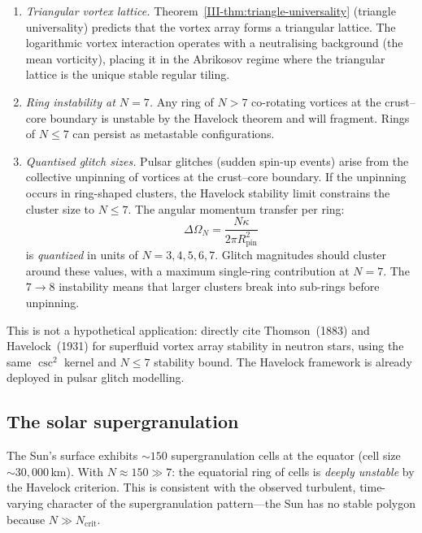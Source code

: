 \begin{enumerate}
\item \emph{Triangular vortex lattice.}
  Theorem~\ref{III-thm:triangle-universality} (triangle universality)
  predicts that the vortex array forms a triangular lattice.
  The logarithmic vortex interaction operates with a neutralising
  background (the mean vorticity), placing it in the Abrikosov
  regime where the triangular lattice is the unique stable
  regular tiling.

\item \emph{Ring instability at $N = 7$.}
  Any ring of $N > 7$ co-rotating vortices at the crust--core
  boundary is unstable by the Havelock theorem and will fragment.
  Rings of $N \le 7$ can persist as metastable configurations.

\item \emph{Quantised glitch sizes.}
  Pulsar glitches (sudden spin-up events) arise from the
  collective unpinning of vortices at the crust--core boundary.
  If the unpinning occurs in ring-shaped clusters, the
  Havelock stability limit constrains the cluster size to $N \le 7$.
  The angular momentum transfer per ring:
  \[
    \Delta\Omega_N = \frac{N\kappa}{2\pi R_{\mathrm{pin}}^2}
  \]
  is \emph{quantized} in units of $N = 3, 4, 5, 6, 7$.
  Glitch magnitudes should cluster around these values,
  with a maximum single-ring contribution at $N = 7$.
  The $7 \to 8$ instability means that larger clusters
  break into sub-rings before unpinning.
\end{enumerate}

\noindent
This is not a hypothetical application:
\citet{Howitt2020} directly cite Thomson~(1883) and
Havelock~(1931) for superfluid vortex array stability in
neutron stars, using the same $\csc^2$ kernel and $N \le 7$
stability bound.
The Havelock framework is already deployed in pulsar
glitch modelling.

\subsection{The solar supergranulation}

The Sun's surface exhibits ${\sim}150$ supergranulation cells
at the equator (cell size ${\sim}30{,}000$\,km).
With $N \approx 150 \gg 7$: the equatorial ring of cells
is \emph{deeply unstable} by the Havelock criterion.
This is consistent with the observed turbulent, time-varying
character of the supergranulation pattern---the Sun has no
stable polygon because $N \gg N_{\mathrm{crit}}$.

